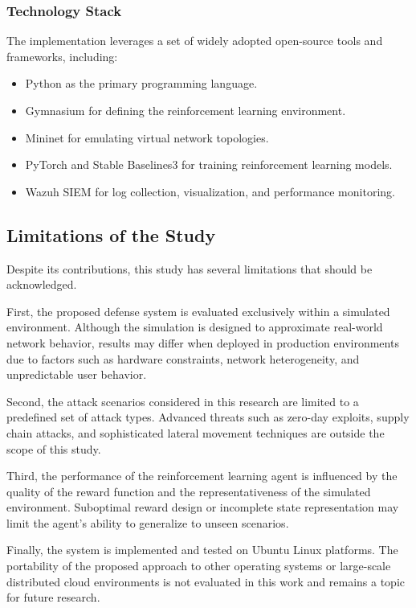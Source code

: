 \documentclass[12pt,a4paper]{report}
\begin{document}
\subsubsection{Technology Stack}

The implementation leverages a set of widely adopted open-source tools and frameworks, including:

\begin{itemize}
    \item Python as the primary programming language.
    \item Gymnasium for defining the reinforcement learning environment.
    \item Mininet for emulating virtual network topologies.
    \item PyTorch and Stable Baselines3 for training reinforcement learning models.
    \item Wazuh SIEM for log collection, visualization, and performance monitoring.
\end{itemize}

\subsection{Limitations of the Study}

Despite its contributions, this study has several limitations that should be acknowledged.

First, the proposed defense system is evaluated exclusively within a simulated environment.
Although the simulation is designed to approximate real-world network behavior, results may differ when deployed in production environments due to factors such as hardware constraints, network heterogeneity, and unpredictable user behavior.

Second, the attack scenarios considered in this research are limited to a predefined set of attack types.
Advanced threats such as zero-day exploits, supply chain attacks, and sophisticated lateral movement techniques are outside the scope of this study.

Third, the performance of the reinforcement learning agent is influenced by the quality of the reward function and the representativeness of the simulated environment.
Suboptimal reward design or incomplete state representation may limit the agent’s ability to generalize to unseen scenarios.

Finally, the system is implemented and tested on Ubuntu Linux platforms.
The portability of the proposed approach to other operating systems or large-scale distributed cloud environments is not evaluated in this work and remains a topic for future research.
\end{document}

